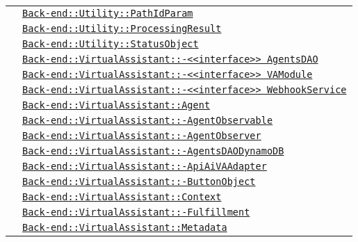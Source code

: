 \begin{longtable}{|>{\centering}m{3cm}|m{10cm}<{\centering}|}
& \hyperref[Back-end::Utility::PathIdParam]{\texttt{Back-end::Utility::PathIdParam}}\\
& \hyperref[Back-end::Utility::ProcessingResult]{\texttt{Back-end::Utility::ProcessingResult}}\\
& \hyperref[Back-end::Utility::StatusObject]{\texttt{Back-end::Utility::StatusObject}}\\
& \hyperref[Back-end::VirtualAssistant::<<interface>> AgentsDAO]{\texttt{Back-end::VirtualAssistant::-\linebreak <<interface>> AgentsDAO}}\\
& \hyperref[Back-end::VirtualAssistant::<<interface>> VAModule]{\texttt{Back-end::VirtualAssistant::-\linebreak <<interface>> VAModule}}\\
& \hyperref[Back-end::VirtualAssistant::<<interface>> WebhookService]{\texttt{Back-end::VirtualAssistant::-\linebreak <<interface>> WebhookService}}\\
& \hyperref[Back-end::VirtualAssistant::Agent]{\texttt{Back-end::VirtualAssistant::Agent}}\\
& \hyperref[Back-end::VirtualAssistant::AgentObservable]{\texttt{Back-end::VirtualAssistant::-\linebreak AgentObservable}}\\
& \hyperref[Back-end::VirtualAssistant::AgentObserver]{\texttt{Back-end::VirtualAssistant::-\linebreak AgentObserver}}\\
& \hyperref[Back-end::VirtualAssistant::AgentsDAODynamoDB]{\texttt{Back-end::VirtualAssistant::-\linebreak AgentsDAODynamoDB}}\\
& \hyperref[Back-end::VirtualAssistant::ApiAiVAAdapter]{\texttt{Back-end::VirtualAssistant::-\linebreak ApiAiVAAdapter}}\\
& \hyperref[Back-end::VirtualAssistant::ButtonObject]{\texttt{Back-end::VirtualAssistant::-\linebreak ButtonObject}}\\
& \hyperref[Back-end::VirtualAssistant::Context]{\texttt{Back-end::VirtualAssistant::Context}}\\
& \hyperref[Back-end::VirtualAssistant::Fulfillment]{\texttt{Back-end::VirtualAssistant::-\linebreak Fulfillment}}\\
& \hyperref[Back-end::VirtualAssistant::Metadata]{\texttt{Back-end::VirtualAssistant::Metadata}}\\

\end{longtable}
